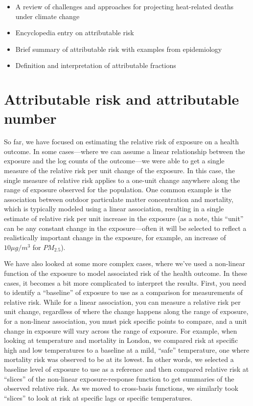 \documentclass[
]{book}
\providecommand{\tightlist}{%
  \setlength{\itemsep}{0pt}\setlength{\parskip}{0pt}}
\begin{document}
\begin{itemize}
\tightlist
\item
  \citet{kinney2008approaches} A review of challenges and approaches for projecting heat-related deaths under climate change
\item
  \citet{benichou2006attributable} Encyclopedia entry on attributable risk
\item
  \citet{northridge1995public} Brief summary of attributable risk with examples from epidemiology
\item
  \citet{greenland1988conceptual} Definition and interpretation of attributable fractions
\end{itemize}

\section{Attributable risk and attributable number}\label{attributable-risk-and-attributable-number}

So far, we have focused on estimating the relative risk of exposure on a health outcome. In some cases---where we can assume a linear relationship between the exposure and the log counts of the outcome---we were able to get a single measure of the relative risk per unit change of the exposure. In this case, the single measure of relative risk applies to a one-unit change anywhere along the range of exposure observed for the population. One common example is the association between outdoor particulate matter concentration and mortality, which is typically modeled using a linear association, resulting in a single estimate of relative risk per unit increase in the exposure (as a note, this ``unit'' can be any constant change in the exposure---often it will be selected to reflect a realistically important change in the exposure, for example, an increase of \(10 \mu g/m^3\) for \(PM_{2.5}\)).

We have also looked at some more complex cases, where we've used a non-linear function of the exposure to model associated risk of the health outcome. In these cases, it becomes a bit more complicated to interpret the results. First, you need to identify a ``baseline'' of exposure to use as a comparison for measurements of relative risk. While for a linear association, you can measure a relative risk per unit change, regardless of where the change happens along the range of exposure, for a non-linear association, you must pick specific points to compare, and a unit change in exposure will vary across the range of exposure. For example, when looking at temperature and mortality in London, we compared risk at specific high and low temperatures to a baseline at a mild, ``safe'' temperature, one where mortality risk was observed to be at its lowest. In other words, we selected a baseline level of exposure to use as a reference and then compared relative risk at ``slices'' of the non-linear exposure-response function to get summaries of the observed relative risk. As we moved to cross-basis functions, we similarly took ``slices'' to look at risk at specific lags or specific temperatures.
\end{document}
